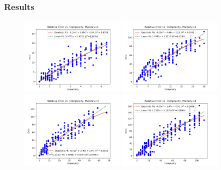 \documentclass{beamer}
\begin{document}
\begin{frame}
    \frametitle{Results}
    \begin{figure}[H]
        \centering
        \includegraphics[width=0.45\textwidth]{images/graph-mem1.png}
        \includegraphics[width=0.45\textwidth]{images/graph-mem2.png}
        \includegraphics[width=0.45\textwidth]{images/graph-mem3.png}
        \includegraphics[width=0.45\textwidth]{images/graph-mem4.png}
    \end{figure}
\end{frame}
\end{document}
